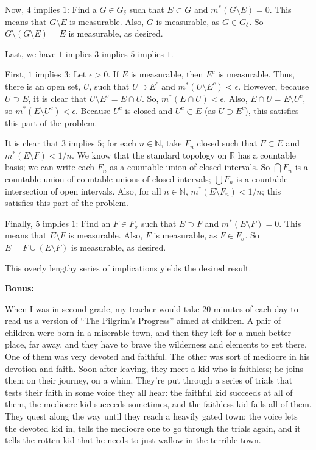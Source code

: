 \documentclass[a4paper,12pt]{article}
\newcommand{\tab}{\hspace{4mm}} %
\newcommand{\shunt}{\vspace{20mm}}
\newcommand{\de}{\delta}
\newcommand{\ep}{\epsilon}
\newcommand{\si}{\sigma}
\newcommand{\N}{\mathbb{N}}
\newcommand{\R}{\mathbb{R}}
\begin{document}
\tab Now, $4$ implies $1$: Find a $G \in G_\de$ such that $E \subset G$ and $m^*(G \setminus E) = 0$. This means that $G \setminus E$ is measurable. Also, $G$ is measurable, as $G \in G_\de$. So $G \setminus (G \setminus E) = E$ is measurable, as desired.

Last, we have $1$ implies $3$ implies $5$ implies $1$.

\tab First, $1$ implies $3$: Let $\ep> 0$. If $E$ is measurable, then $E^c$ is measurable. Thus, there is an open set, $U$, such that $U \supset E^c$ and $m^*(U \setminus E^c) < \ep$. However, because $U \supset E$, it is clear that $U \setminus E^c = E \cap U$. So, $m^*(E \cap U) < \ep$. Also, $E \cap U = E \setminus U^c$, so $m^*(E \setminus U^c) < \ep$. Because $U^c$ is closed and $U^c \subset E$ (as $U \supset E^c$), this satisfies this part of the problem.

\tab It is clear that $3$ implies $5$; for each $n \in \N$, take $F_n$ closed such that $F \subset E$ and $m^*(E \setminus F) < 1/n$. We know that the standard topology on $\R$ has a countable basis; we can write each $F_n$ as a countable union of closed intervals. So $\bigcap F_n$ is a countable union of countable unions of closed intervals; $\bigcup F_n$ is a countable intersection of open intervals. Also, for all $n \in \N$, $m^*(E \setminus F_n) < 1/n$; this satisfies this part of the problem.

\tab Finally, $5$ implies $1$: Find an $F \in F_\si$ such that $E \supset F$ and $m^*(E \setminus F) = 0$. This means that $E \setminus F$ is measurable. Also, $F$ is measurable, as $F \in F_\si$. So $E = F \cup (E \setminus F)$ is measurable, as desired.

This overly lengthy series of implications yields the desired result.

\shunt

{\bf Bonus:}

When I was in second grade, my teacher would take 20 minutes of each day to read us a version of ``The Pilgrim's Progress'' aimed at children. A pair of children were born in a miserable town, and then they left for a much better place, far away, and they have to brave the wilderness and elements to get there. One of them was very devoted and faithful. The other was sort of mediocre in his devotion and faith. Soon after leaving, they meet a kid who is faithless; he joins them on their journey, on a whim. They're put through a series of trials that tests their faith in some voice they all hear: the faithful kid succeeds at all of them, the mediocre kid succeeds sometimes, and the faithless kid fails all of them. They quest along the way until they reach a heavily gated town; the voice lets the devoted kid in, tells the mediocre one to go through the trials again, and it tells the rotten kid that he needs to just wallow in the terrible town.
\end{document}
